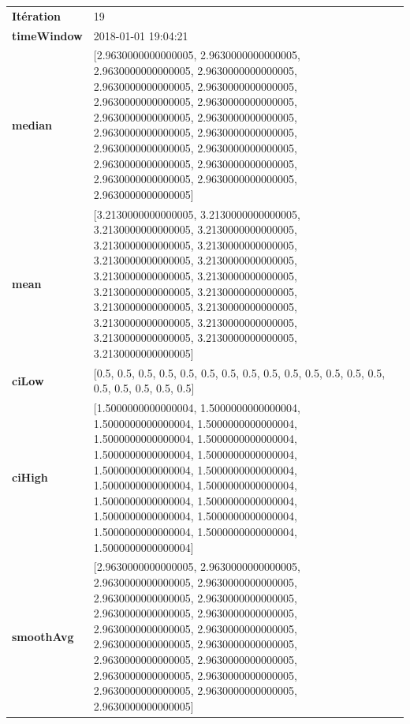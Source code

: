 \begin{table}[H]
	\centering
	\begin{tabularx}{\textwidth}{lX}
		\textbf{Itération}& 19 \\
		\textbf{timeWindow}& 2018-01-01 19:04:21  \\
		\textbf{median}& [2.9630000000000005, 2.9630000000000005, 2.9630000000000005, 2.9630000000000005, 2.9630000000000005, 2.9630000000000005, 2.9630000000000005, 2.9630000000000005, 2.9630000000000005, 2.9630000000000005, 2.9630000000000005, 2.9630000000000005, 2.9630000000000005, 2.9630000000000005, 2.9630000000000005, 2.9630000000000005, 2.9630000000000005, 2.9630000000000005, 2.9630000000000005]  \\
		\textbf{mean} & [3.2130000000000005, 3.2130000000000005, 3.2130000000000005, 3.2130000000000005, 3.2130000000000005, 3.2130000000000005, 3.2130000000000005, 3.2130000000000005, 3.2130000000000005, 3.2130000000000005, 3.2130000000000005, 3.2130000000000005, 3.2130000000000005, 3.2130000000000005, 3.2130000000000005, 3.2130000000000005, 3.2130000000000005, 3.2130000000000005, 3.2130000000000005] \\
		\textbf{ciLow}& [0.5, 0.5, 0.5, 0.5, 0.5, 0.5, 0.5, 0.5, 0.5, 0.5, 0.5, 0.5, 0.5, 0.5, 0.5, 0.5, 0.5, 0.5, 0.5] \\
		\textbf{ciHigh}& [1.5000000000000004, 1.5000000000000004, 1.5000000000000004, 1.5000000000000004, 1.5000000000000004, 1.5000000000000004, 1.5000000000000004, 1.5000000000000004, 1.5000000000000004, 1.5000000000000004, 1.5000000000000004, 1.5000000000000004, 1.5000000000000004, 1.5000000000000004, 1.5000000000000004, 1.5000000000000004, 1.5000000000000004, 1.5000000000000004, 1.5000000000000004] \\
		\textbf{smoothAvg}&  [2.9630000000000005, 2.9630000000000005, 2.9630000000000005, 2.9630000000000005, 2.9630000000000005, 2.9630000000000005, 2.9630000000000005, 2.9630000000000005, 2.9630000000000005, 2.9630000000000005, 2.9630000000000005, 2.9630000000000005, 2.9630000000000005, 2.9630000000000005, 2.9630000000000005, 2.9630000000000005, 2.9630000000000005, 2.9630000000000005, 2.9630000000000005] \\
			\end{tabularx} 
		\end{table}
		
